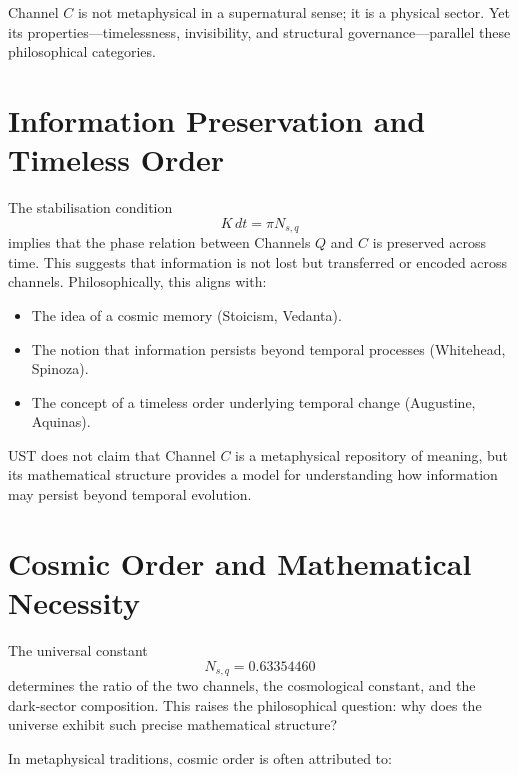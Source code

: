 \documentclass[12pt]{article}
\begin{document}
Channel $C$ is not metaphysical in a supernatural sense; it is a physical
sector. Yet its properties---timelessness, invisibility, and structural
governance---parallel these philosophical categories.


\section{Information Preservation and Timeless Order}

The stabilisation condition
\[
K\,dt = \pi N_{s,q}
\]
implies that the phase relation between Channels $Q$ and $C$ is preserved
across time. This suggests that information is not lost but transferred or
encoded across channels. Philosophically, this aligns with:

\begin{itemize}
\item The idea of a cosmic memory (Stoicism, Vedanta).
\item The notion that information persists beyond temporal processes
(Whitehead, Spinoza).
\item The concept of a timeless order underlying temporal change
(Augustine, Aquinas).
\end{itemize}

UST does not claim that Channel $C$ is a metaphysical repository of meaning,
but its mathematical structure provides a model for understanding how
information may persist beyond temporal evolution.


\section{Cosmic Order and Mathematical Necessity}

The universal constant
\[
N_{s,q} = 0.63354460
\]
determines the ratio of the two channels, the cosmological constant, and the
dark-sector composition. This raises the philosophical question: why does the
universe exhibit such precise mathematical structure?

In metaphysical traditions, cosmic order is often attributed to:
\end{document}
